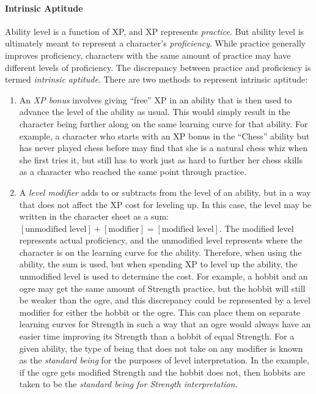 \paragraph{Intrinsic Aptitude}
Ability level is a function of XP, and XP represents \emph{practice}.
But ability level is ultimately meant to represent a character's \emph{proficiency}.
While practice generally improves proficiency, characters with the same amount of practice may have different levels of proficiency.
The discrepancy between practice and proficiency is termed \emph{intrinsic aptitude}.
There are two methods to represent intrinsic aptitude:
\begin{enumerate}
\item
An \emph{XP bonus} involves giving ``free'' XP in an ability that is then used to advance the level of the ability as usual.
This would simply result in the character being further along on the same learning curve for that ability.
For example, a character who starts with an XP bonus in the ``Chess'' ability but has never played chess before
may find that she is a natural chess whiz when she first tries it,
but still has to work just as hard to further her chess skills as a character who reached the same point through practice.
\item
A \emph{level modifier} adds to or subtracts from the level of an ability,
but in a way that does not affect the XP cost for leveling up.
In this case,
the level may be written in the character sheet as a sum: $[\textrm{unmodified level}] + [\textrm{modifier}] = [\textrm{modified level}]$.
The modified level represents actual proficiency,
and the unmodified level represents where the character is on the learning curve for the ability.
Therefore,
when using the ability,
the sum is used,
but when spending XP to level up the ability,
the unmodified level is used to determine the cost.
For example,
a hobbit and an ogre may get the same amount of Strength practice,
but the hobbit will still be weaker than the ogre,
and this discrepancy could be represented by a level modifier for either the hobbit or the ogre.
This can place them on separate learning curves for Strength in such a way that an ogre would always have an easier time improving its Strength than a hobbit of equal Strength.
For a given ability,
the type of being that does not take on any modifier is known as the \emph{standard being} for the purposes of level interpretation.
In the example,
if the ogre gets modified Strength and the hobbit does not,
then hobbits are taken to be the \emph{standard being for Strength interpretation}.
\end{enumerate}

